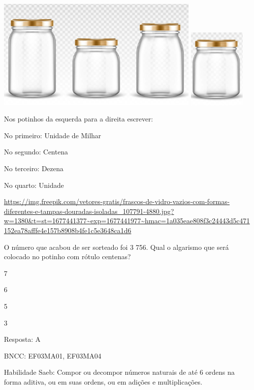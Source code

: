 \begin{escolha}
\includegraphics[width=3.90833in,height=2.14168in]{media/image129.png}
\includegraphics[width=1.10010in,height=1.54180in]{media/image130.png}

Nos potinhos da esquerda para a direita escrever:

No primeiro: Unidade de Milhar

No segundo: Centena

No terceiro: Dezena

No quarto: Unidade

\url{https://img.freepik.com/vetores-gratis/frascos-de-vidro-vazios-com-formas-diferentes-e-tampas-douradas-isoladas_107791-4880.jpg?w=1380\&t=st=1677441377~exp=1677441977~hmac=1a035eae808f3c24443d5c471152ea78afffe4e157b8908b4fe1c5e3648ca1d6}

O número que acabou de ser sorteado foi 3 756. Qual o algarismo que será
colocado no potinho com rótulo centenas?

\begin{escolha}

\item
  7
\item
  6
\item
  5
\item
  3
\end{escolha}

Resposta: A

BNCC: EF03MA01, EF03MA04

Habilidade Saeb: Compor ou decompor números naturais de até 6 ordens na
forma aditiva, ou em suas ordens, ou em adições e multiplicações.


\end{escolha}
